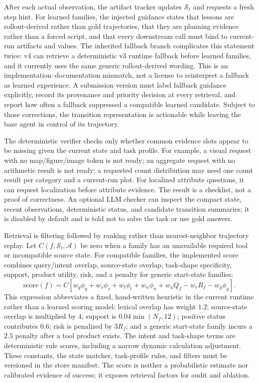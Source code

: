 \documentclass[10pt]{article}
\newcommand{\state}{\mathcal{S}}
\begin{document}
After each actual observation, the artifact tracker updates $\state_t$ and requests a fresh step hint. For learned families, the injected guidance states that lessons are rollout-derived rather than gold trajectories, that they are planning evidence rather than a forced script, and that every downstream call must bind to current-run artifacts and values. The inherited fallback branch complicates this statement twice: v4 can retrieve a deterministic v3 runtime fallback before learned families, and it currently uses the same generic rollout-derived wording. This is an implementation--documentation mismatch, not a license to reinterpret a fallback as learned experience. A submission version must label fallback guidance explicitly, record its provenance and priority decision at every retrieval, and report how often a fallback suppressed a compatible learned candidate. Subject to those corrections, the transition representation is actionable while leaving the base agent in control of its trajectory.

The deterministic verifier checks only whether common evidence slots appear to be missing given the current state and task profile. For example, a visual request with no map/figure/image token is not ready; an aggregate request with no arithmetic result is not ready; a requested count distribution may need one count result per category and a current-run plot. For localized attribute questions, it can request localization before attribute evidence. The result is a checklist, not a proof of correctness. An optional LLM checker can inspect the compact state, recent observations, deterministic status, and candidate transition summaries; it is disabled by default and is told not to solve the task or use gold answers.

Retrieval is filtering followed by ranking rather than nearest-neighbor trajectory replay. Let $C(f,\state_t,\mathcal{A})$ be zero when a family has an unavailable required tool or incompatible source state. For compatible families, the implemented score combines query/intent overlap, source-state overlap, task-shape specificity, support, product utility, risk, and a penalty for generic start-state families:
\begin{equation}
\mathrm{score}(f)=C\left[w_q\phi_q+w_s\phi_s+w_t\phi_t+w_n\phi_n+w_uQ_f-w_rR_f-w_g\phi_g\right].
\end{equation}
This expression abbreviates a fixed, hand-written heuristic in the current runtime rather than a learned scoring model: lexical overlap has weight $1.2$; source-state overlap is multiplied by $4$; support is $0.04\min(N_f,12)$; positive status contributes $0.6$; risk is penalized by $3R_f$; and a generic start-state family incurs a $2.5$ penalty after a tool product exists. The intent and task-shape terms are deterministic rule scores, including a narrow dynamic calculation adjustment. These constants, the state matcher, task-profile rules, and filters must be versioned in the store manifest. The score is neither a probabilistic estimate nor calibrated evidence of success; it exposes retrieval factors for audit and ablation.
\end{document}
